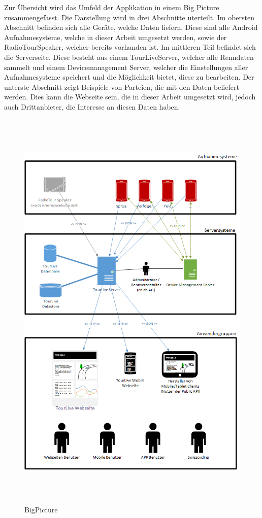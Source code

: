\begin{flushleft}
Zur Übersicht wird das Umfeld der Applikation in einem Big Picture zusammengefasst.
Die Darstellung wird in drei Abschnitte uterteilt. Im obersten Abschnitt befinden sich alle Geräte, welche Daten liefern. Diese sind alle Android Aufnahmesysteme, welche in dieser Arbeit umgesetzt werden, sowie der RadioTourSpeaker, welcher bereits vorhanden ist. \linebreak 
Im mittleren Teil befindet sich die Serverseite. Diese besteht aus einem TourLiveServer, welcher alle Renndaten sammelt und einem Devicemanagement Server, welcher die Einstellungen aller Aufnahmesysteme speichert und die Möglichkeit bietet, diese zu bearbeiten.\linebreak 
Der unterste Abschnitt zeigt Beispiele von Parteien, die mit den Daten beliefert werden. Dies kann die Webseite sein, die in dieser Arbeit umgesetzt wird, jedoch auch Drittanbieter, die Interesse an diesen Daten haben.

\end{flushleft}
\begin{figure}[H]
	\centering
	\includegraphics[height=200mm]{images/BigPicture.png}
	\caption{BigPicture}
\end{figure}

